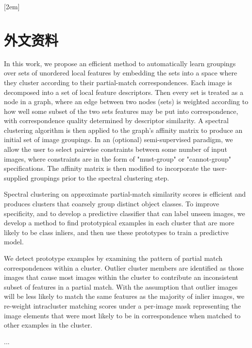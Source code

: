 
[2em]{\vspace{.5\baselineskip}\bf\xiaosi\song}%
             {\prechaptername\CJKnumber{\thecontentslabel}\postchaptername\qquad}{}{}             %
\setcounter{page}{1}       %
\clearpage
\chapter*{外文资料}

In this work, we propose an efficient method to automatically learn groupings over sets of unordered local features by embedding the sets into a space where they cluster according to their partial-match correspondences. Each image is decomposed into a set of local feature descriptors. Then every set is treated as a node in a graph, where an edge between two nodes (sets) is weighted according to how well some subset of the two sets features may be put into correspondence, with correspondence quality determined by descriptor similarity. A spectral clustering algorithm is then applied to the graph's affinity matrix to produce an initial set of image groupings. In an (optional) semi-supervised paradigm, we allow the user to select pairwise constraints between some number of input images, where constraints are in the form of "must-group" or "cannot-group" specifications. The affinity matrix is then modified to incorporate the user-supplied groupings prior to the spectral clustering step.


Spectral clustering on approximate partial-match similarity scores is efficient and produces clusters that coarsely group distinct object classes. To improve specificity, and to develop a predictive classifier that can label unseen images, we develop a method to find prototypical examples in each cluster that are more likely to be class inliers, and then use these prototypes to train a predictive model.


We detect prototype examples by examining the pattern of partial match correspondences within a cluster. Outlier cluster members are identified as those images that cause most images within the cluster to contribute an inconsistent subset of features in a partial match. With the assumption that outlier images will be less likely to match the same features as the majority of inlier images, we re-weight intracluster matching scores under a per-image mask representing the image elements that were most likely to be in correspondence when matched to other examples in the cluster.

...
